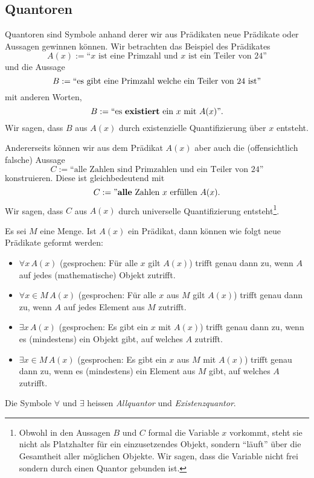 \subsection*{Quantoren}
Quantoren sind Symbole  anhand derer wir aus Prädikaten neue Prädikate oder Aussagen gewinnen
können. Wir betrachten das Beispiel des Prädikates
\[
 A(x):=\text{``}x\text{ ist eine Primzahl und } x\text{ ist ein Teiler von }24\text{''}
\]
und die Aussage
\[
 B:= ``\text{es gibt eine Primzahl welche ein Teiler von }24\text{ ist''}
\]
mit anderen Worten,
\[
 B:=``\text{es \textbf{existiert} ein }x\text{ mit }A(x)\text{''}.
\]
Wir sagen, dass $B$ aus $A(x)$ durch existenzielle Quantifizierung über $x$ entsteht.

Andererseits können wir aus dem Prädikat $A(x)$ aber auch die (offensichtlich falsche) Aussage
\[
 C:=\text{``alle Zahlen sind Primzahlen und ein Teiler von }24\text{''}
\]
konstruieren. Diese ist gleichbedeutend mit
\[
 C:=\text{''\textbf{alle} Zahlen }x\text{ erfüllen }A(x).
\]
Wir sagen, dass $C$ aus $A(x)$ durch universelle Quantifizierung entsteht\footnote{Obwohl in den Aussagen $B$ und
$C$ formal die Variable $x$ vorkommt, steht sie nicht als Platzhalter für ein einzusetzendes Objekt, sondern
``läuft'' über die Gesamtheit aller möglichen Objekte. Wir sagen, dass die Variable nicht frei sondern durch
einen Quantor gebunden ist.}.

\begin{df}
Es sei $M$ eine Menge. Ist $A(x)$ ein Prädikat, dann können wie folgt neue Prädikate geformt werden:
\begin{itemize}
\item $\forall x\,A(x)$ (gesprochen: Für alle $x$ gilt $A(x)$) trifft genau dann zu, wenn $A$ auf jedes (mathematische) Objekt zutrifft.
\item $\forall x\in M\,A(x)$ (gesprochen: Für alle $x$ aus $M$ gilt $A(x)$) trifft genau dann zu, wenn $A$ auf jedes Element aus $M$ zutrifft.
\item $\exists x\,A(x)$ (gesprochen: Es gibt ein $x$ mit $A(x)$) trifft genau dann zu, wenn es (mindestens) ein  Objekt gibt, auf welches $A$ zutrifft.
\item $\exists x\in M\,A(x)$ (gesprochen: Es gibt ein $x$ aus $M$ mit $A(x)$) trifft genau dann zu, wenn es (mindestens) ein Element aus $M$ gibt, auf welches $A$ zutrifft.
\end{itemize}
Die Symbole $\forall$ und $\exists$ heissen \textit{Allquantor} und \textit{Existenzquantor}.
\end{df}

